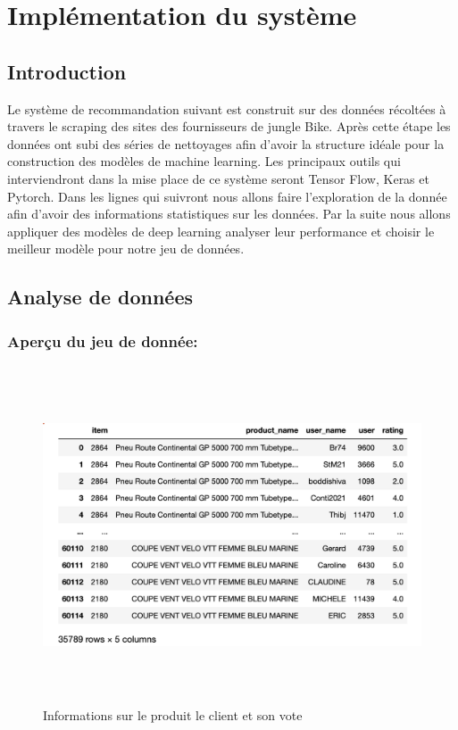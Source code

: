 \chapter{Implémentation du système}
\minitoc
\newpage

\section{Introduction}

Le système de recommandation suivant est construit sur des données récoltées à travers le scraping des sites des fournisseurs de jungle Bike. Après cette étape les données ont subi des séries de nettoyages afin d’avoir la structure idéale pour la construction des modèles de machine learning. Les principaux outils qui interviendront dans la mise place de ce système seront Tensor Flow, Keras et Pytorch. Dans les lignes qui suivront nous allons faire l’exploration de la donnée afin d’avoir des informations statistiques sur les données. Par la suite nous allons appliquer des modèles de deep learning analyser leur performance et choisir le meilleur modèle pour notre jeu de données.

\newpage
\section{Analyse de données}
\subsection{Aperçu du jeu de donnée:}
\begin{figure}[h]
\begin{center}
\includegraphics[width=15cm,height=10cm]{images/model_dataset.png}
\caption[Informations sur le produit le client et son vote]{Informations sur le produit le client et son vote}
\label{monlabel}
\end{center}
\end{figure}
\newpage


